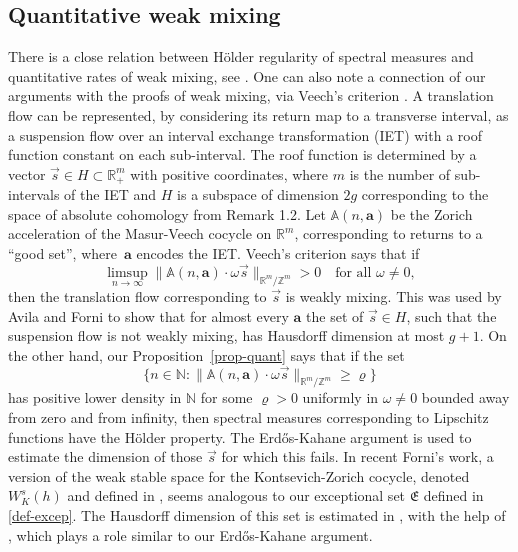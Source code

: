 \documentclass[10pt]{amsart}
\newcommand{\sep}{:}
\theoremstyle{plain}
\theoremstyle{definition}
\newcommand\bom{{\boldsymbol a}}\let\ba\bom
\let\om\omega
\newcommand\Fre{\mathfrak{E}}
\newcommand\Aa{\mathbb{A}}
\newcommand{\R}{\mathbb{R}}
\newcommand{\Z}{\mathbb{Z}}
\newcommand{\N}{\mathbb{N}}
\begin{document}
\subsection{Quantitative weak mixing} There is a close relation between Hölder regularity of spectral measures and quantitative rates of weak mixing, see \cite{BuSo18b,Forni2}. One can also note a connection of our arguments with the proofs of weak mixing, via Veech's criterion \cite{veechamj}. A translation flow can be represented, by considering its return map to a transverse interval, as a suspension flow over an interval exchange transformation (IET) with a roof function constant on each sub-interval. The roof function is determined by a vector $\vec s\in H\subset \R^m_+$ with positive coordinates, where $m$ is the number of sub-intervals of the IET and $H$ is a subspace of dimension $2g$ corresponding to the space of absolute cohomology from Remark 1.2. Let $\Aa(n,\bom)$ be the Zorich acceleration of the Masur-Veech cocycle on $\R^m$, corresponding to returns to a ``good set'', where~$\bom$ encodes the IET. Veech's criterion \cite[\S 7]{veechamj} says that if\vspace*{-3pt}
\[
\limsup_{n\to \infty} \|\Aa(n,\bom)\cdot \om \vec{s}\|_{\R^m/\Z^m}>0\quad \text{for all }\om\ne 0,
\]
then the translation flow corresponding to $\vec s$ is weakly mixing. This was used by Avila and Forni \cite[Th.\,A.2]{AF} to show that for almost every $\bom$ the set of $\vec s\in H$, such that the suspension flow is not weakly mixing, has Hausdorff dimension at most $g+1$. On the other hand, our Proposition~\ref{prop-quant} says that if the set\vspace*{-3pt}
\[
\{n\in \N\sep \|\Aa(n,\bom)\cdot \om \vec{s}\|_{\R^m/\Z^m} \ge \varrho\}
\]
has positive lower density in $\N$ for some $\varrho>0$ uniformly in $\om\ne 0$ bounded away from zero and from infinity, then spectral measures corresponding to Lipschitz functions have the Hölder property. The Erd\H{o}s-Kahane argument is used to estimate the dimension of those $\vec s$ for which this fails.
In recent Forni's work, a version of the weak stable space for the Kontsevich-Zorich cocycle, denoted $W_K^s(h)$ and defined in \cite[\S6]{Forni2}, seems analogous to our exceptional set $\Fre$ defined in \eqref{def-excep}. The Hausdorff dimension of this set is estimated in \cite[Th.\,6.3]{Forni2}, with the help of \cite[Lem.\,6.2]{Forni2}, which plays a role similar to our Erd\H{o}s-Kahane argument.
\end{document}

